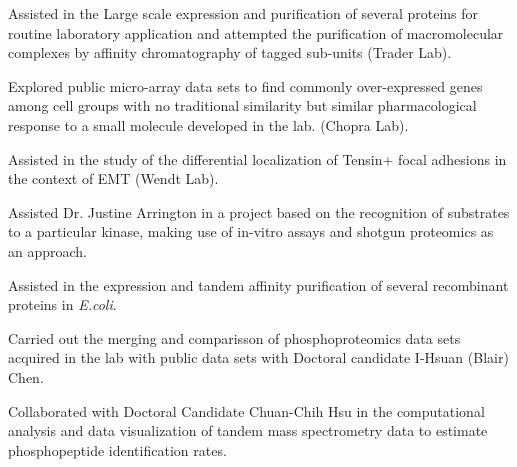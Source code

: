 \documentclass[]{deedy-resume-openfont}
\begin{document}
\begin{minipage}[t]{0.66\textwidth}
\begin{tightemize}
    \item Assisted in the Large scale expression and purification of several proteins for routine laboratory application and attempted the purification of macromolecular complexes by affinity chromatography of tagged sub-units (Trader Lab).
    \item Explored public micro-array data sets to find commonly over-expressed genes among cell groups with no traditional similarity but similar pharmacological response to a small molecule developed in the lab. (Chopra Lab).
    \item Assisted in the study of the differential localization of Tensin+ focal adhesions in the context of EMT (Wendt Lab).
\end{tightemize}
\sectionsep

\begin{tightemize}
    \item Assisted Dr. Justine Arrington in a project based on the recognition of substrates to a particular kinase, making use of in-vitro assays and shotgun proteomics as an approach.
    \item Assisted in the expression and tandem affinity purification of several recombinant proteins in \textit{E.coli}.
    \item Carried out the merging and comparisson of phosphoproteomics data sets acquired in the lab with public data sets with Doctoral candidate I-Hsuan (Blair) Chen.
    \item Collaborated with Doctoral Candidate Chuan-Chih Hsu in the computational analysis and data visualization of tandem mass spectrometry data to estimate phosphopeptide identification rates. 
\end{tightemize}
\sectionsep




\end{minipage}
\end{document}
